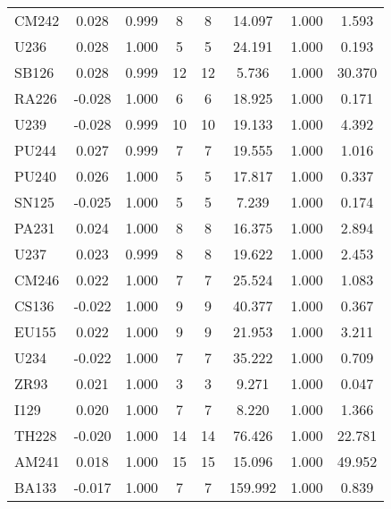 \begin{tabular}{|l|ccccccc|}
CM242 & 0.028 & 0.999 & 8 & 8 & 14.097 & 1.000 & 1.593\\
U236 & 0.028 & 1.000 & 5 & 5 & 24.191 & 1.000 & 0.193\\
SB126 & 0.028 & 0.999 & 12 & 12 & 5.736 & 1.000 & 30.370\\
RA226 & -0.028 & 1.000 & 6 & 6 & 18.925 & 1.000 & 0.171\\
U239 & -0.028 & 0.999 & 10 & 10 & 19.133 & 1.000 & 4.392\\
PU244 & 0.027 & 0.999 & 7 & 7 & 19.555 & 1.000 & 1.016\\
PU240 & 0.026 & 1.000 & 5 & 5 & 17.817 & 1.000 & 0.337\\
SN125 & -0.025 & 1.000 & 5 & 5 & 7.239 & 1.000 & 0.174\\
PA231 & 0.024 & 1.000 & 8 & 8 & 16.375 & 1.000 & 2.894\\
U237 & 0.023 & 0.999 & 8 & 8 & 19.622 & 1.000 & 2.453\\
CM246 & 0.022 & 1.000 & 7 & 7 & 25.524 & 1.000 & 1.083\\
CS136 & -0.022 & 1.000 & 9 & 9 & 40.377 & 1.000 & 0.367\\
EU155 & 0.022 & 1.000 & 9 & 9 & 21.953 & 1.000 & 3.211\\
U234 & -0.022 & 1.000 & 7 & 7 & 35.222 & 1.000 & 0.709\\
ZR93 & 0.021 & 1.000 & 3 & 3 & 9.271 & 1.000 & 0.047\\
I129 & 0.020 & 1.000 & 7 & 7 & 8.220 & 1.000 & 1.366\\
TH228 & -0.020 & 1.000 & 14 & 14 & 76.426 & 1.000 & 22.781\\
AM241 & 0.018 & 1.000 & 15 & 15 & 15.096 & 1.000 & 49.952\\
BA133 & -0.017 & 1.000 & 7 & 7 & 159.992 & 1.000 & 0.839\\
\hline
\end{tabular}
